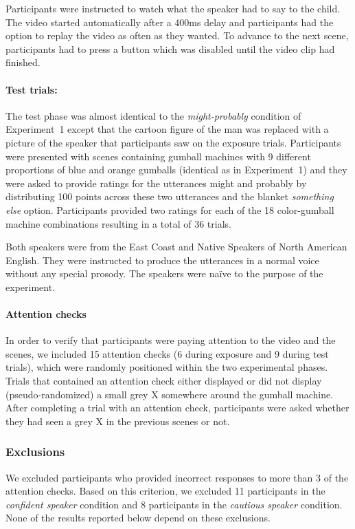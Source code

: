 \documentclass[man, floatsintext]{apa6}
\begin{document}
Participants were instructed to watch what the speaker had to say to the child. The video started automatically after a 400ms delay and participants had the option to replay the video as often as they wanted. To advance to the next scene, participants had to press a button which was disabled until the video clip had finished.

\paragraph{Test trials:} The test phase was almost identical to the  \textit{might-probably} condition of Experiment~1 except that the cartoon figure of the man was replaced with a picture of the speaker that participants saw on the exposure trials. Participants were presented with scenes containing gumball machines with 9 different proportions of blue and orange gumballs  (identical as in Experiment~1) and they were asked to provide ratings for the utterances {\sc might} and {\sc probably} by distributing 100 points across these two utterances and the blanket {\it something else} option. Participants provided two ratings for each of the 18 color-gumball machine combinations resulting in a total of 36 trials. 

Both speakers were from the East Coast and Native Speakers of North American English.
They were instructed to produce the utterances in a normal voice without any special prosody. The speakers were
na\"ive to the purpose of the experiment.


\paragraph{Attention checks}  In order to verify that participants were paying attention to the video and the scenes, we included 15 attention checks (6 during exposure and 9 during test trials), which were randomly positioned within the two experimental phases. Trials that contained an attention check either displayed or did not display (pseudo-randomized) a small grey X somewhere around the gumball machine. After completing a trial with an attention check, participants were asked whether they had seen a grey X in the previous scenes or not.

\subsubsection{Exclusions} We excluded participants who provided incorrect responses to more than 3 of the attention checks. Based on this criterion, we excluded 11 participants in the \textit{confident speaker} condition and 8 participants in the \textit{cautious speaker} condition. None of the results reported below depend on these exclusions.
\end{document}
